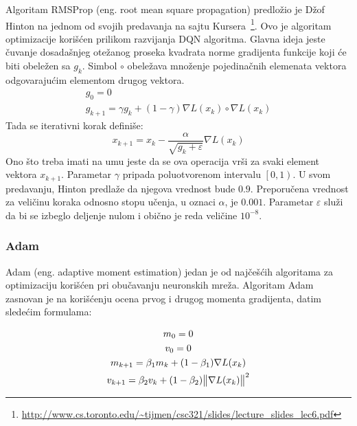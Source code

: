 Algoritam RMSProp (eng. root mean square propagation) predložio je Džof Hinton na jednom od svojih predavanja na sajtu Kursera~\footnote{\url{http://www.cs.toronto.edu/~tijmen/csc321/slides/lecture_slides_lec6.pdf}}. Ovo je algoritam optimizacije korišćen prilikom razvijanja DQN algoritma. Glavna ideja jeste čuvanje dosadašnjeg otežanog proseka kvadrata norme gradijenta funkcije koji će biti obeležen sa $g_k$. Simbol $\circ$ obeležava množenje pojedinačnih elemenata vektora odgovarajućim elementom drugog vektora.
\begin{equation}
	\begin{gathered}
		g_0 = 0 \\
		g_{k+1} = \gamma g_k + (1 - \gamma)\nabla L(x_k) \circ \nabla L(x_k)
	\end{gathered}
\end{equation}
Tada se iterativni korak definiše: 
\begin{equation}
	x_{k+1} = x_k - \frac{\alpha}{\sqrt{g_k + \varepsilon}} \nabla L(x_k)
\end{equation}
Ono što treba imati na umu jeste da se ova operacija vrši za svaki element vektora $x_{k+1}$.
Parametar $\gamma$ pripada poluotvorenom intervalu $\left[0, 1\right) $. U svom predavanju, Hinton predlaže da njegova vrednost bude $0.9$. Preporučena vrednost za veličinu koraka odnosno stopu učenja, u oznaci $\alpha$, je $0.001$. Parametar $\varepsilon$ služi da bi se izbeglo deljenje nulom i obično je reda veličine $10^{-8}$.   

\subsubsection{Adam}

Adam (eng. adaptive moment estimation) jedan je od najčešćih algoritama za optimizaciju korišćen pri obučavanju neuronskih mreža. Algoritam Adam zasnovan je na korišćenju ocena prvog i drugog momenta gradijenta, datim sledećim formulama:

\begin{equation}
	\begin{gathered}
			m_0 = 0 \\
			v_0 = 0 \\ 
			m_{k+1} = \beta_1 m_k + (1-\beta_1) \nabla L(x_k) \\
			v_{k+1} = \beta_2 v_k + (1-\beta_2) \norm{\nabla L(x_k)}^2
	\end{gathered}
\end{equation}

